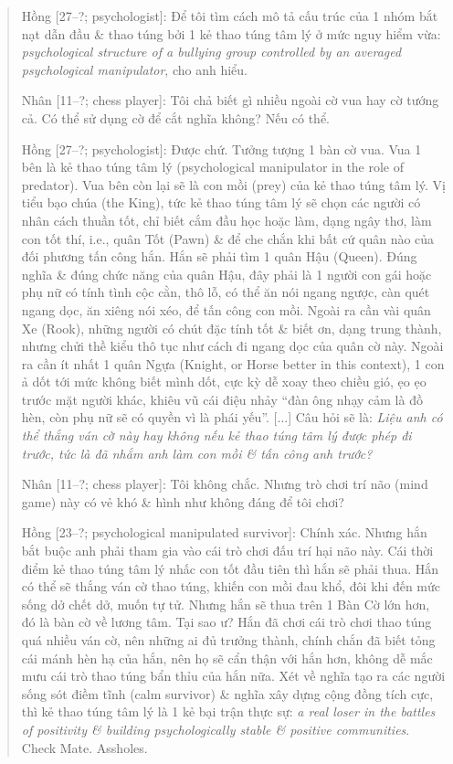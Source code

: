 \documentclass[12pt,oneside]{book}
\begin{document}
\begin{quote}
	{\sf Hồng [27--?; psychologist]}: Để tôi tìm cách mô tả cấu trúc của 1 nhóm bắt nạt dẫn đầu \& thao túng bởi 1 kẻ thao túng tâm lý ở mức nguy hiểm vừa: {\it psychological structure of a bullying group controlled by an averaged psychological manipulator}, cho anh hiểu.
	
	{\sf Nhân [11--?; chess player]}: Tôi chả biết gì nhiều ngoài cờ vua hay cờ tướng cả. Có thể sử dụng cờ để cắt nghĩa không? Nếu có thể.
	
	{\sf Hồng [27--?; psychologist]}: Được chứ. Tưởng tượng 1 bàn cờ vua. Vua 1 bên là kẻ thao túng tâm lý (psychological manipulator in the role of predator). Vua bên còn lại sẽ là con mồi (prey) của kẻ thao túng tâm lý. Vị tiểu bạo chúa (the King), tức kẻ thao túng tâm lý sẽ chọn các người có nhân cách thuần tốt, chỉ biết cắm đầu học hoặc làm, dạng ngây thơ, làm con tốt thí, i.e., quân Tốt (Pawn) \& để che chắn khi bất cứ quân nào của đối phương tấn công hắn. Hắn sẽ phải tìm 1 quân Hậu (Queen). Đúng nghĩa \& đúng chức năng của quân Hậu, đây phải là 1 người con gái hoặc phụ nữ có tính tình cộc cằn, thô lỗ, có thể ăn nói ngang ngược, càn quét ngang dọc, ăn xiêng nói xéo, để tấn công con mồi. Ngoài ra cần vài quân Xe (Rook), những người có chút đặc tính tốt \& biết ơn, dạng trung thành, nhưng chửi thề kiểu thô tục như cách đi ngang dọc của quân cờ này. Ngoài ra cần ít nhất 1 quân Ngựa (Knight, or Horse better in this context), 1 con ả dốt tới mức không biết mình dốt, cực kỳ dễ xoay theo chiều gió, ẹo ẹo trước mặt người khác, khiêu vũ cái điệu nhảy ``đàn ông nhạy cảm là đồ hèn, còn phụ nữ sẽ có quyền vì là phái yếu''. [...] Câu hỏi sẽ là: {\it Liệu anh có thể thắng ván cờ này hay không nếu kẻ thao túng tâm lý được phép đi trước, tức là đã nhắm anh làm con mồi \& tấn công anh trước?}
	
	{\sf Nhân [11--?; chess player]}: Tôi không chắc. Nhưng trò chơi trí não (mind game) này có vẻ khó \& hình như không đáng để tôi chơi?
	
	{\sf Hồng [23--?; psychological manipulated survivor]}: Chính xác. Nhưng hắn bắt buộc anh phải tham gia vào cái trò chơi đấu trí hại não này. Cái thời điểm kẻ thao túng tâm lý nhấc con tốt đầu tiên thì hắn sẽ phải thua. Hắn có thể sẽ thắng ván cờ thao túng, khiến con mồi đau khổ, đôi khi đến mức sống dở chết dở, muốn tự tử. Nhưng hắn sẽ thua trên 1 Bàn Cờ lớn hơn, đó là bàn cờ về lương tâm. Tại sao ư? Hắn đã chơi cái trò chơi thao túng quá nhiều ván cờ, nên những ai đủ trưởng thành, chính chắn đã biết tỏng cái mánh hèn hạ của hắn, nên họ sẽ cẩn thận với hắn hơn, không dễ mắc mưu cái trò thao túng bẩn thỉu của hắn nữa. Xét về nghĩa tạo ra các người sống sót điềm tĩnh (calm survivor) \& nghĩa xây dựng cộng đồng tích cực, thì kẻ thao túng tâm lý là 1 kẻ bại trận thực sự: {\it a real loser in the battles of positivity \& building psychologically stable \& positive communities}. Check Mate. Assholes.
\end{quote}
\end{document}

